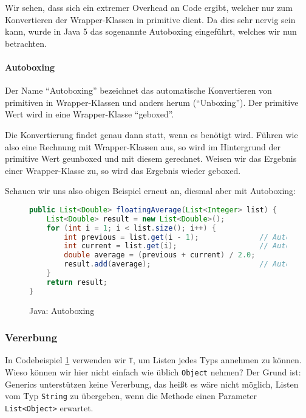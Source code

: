		Wir sehen, dass sich ein extremer Overhead an Code ergibt, welcher nur zum Konvertieren der Wrapper-Klassen in primitive dient. Da dies sehr nervig sein kann, wurde in Java 5 das sogenannte Autoboxing eingeführt, welches wir nun betrachten.
	
		\paragraph{Autoboxing}
			Der Name \enquote{Autoboxing} bezeichnet das automatische Konvertieren von primitiven in Wrapper-Klassen und anders herum (\enquote{Unboxing}). Der primitive Wert wird in eine Wrapper-Klasse \enquote{geboxed}.
			
			Die Konvertierung findet genau dann statt, wenn es benötigt wird. Führen wie also eine Rechnung mit Wrapper-Klassen aus, so wird im Hintergrund der primitive Wert geunboxed und mit diesem gerechnet. Weisen wir das Ergebnis einer Wrapper-Klasse zu, so wird das Ergebnis wieder geboxed.
			
			
			Schauen wir uns also obigen Beispiel erneut an, diesmal aber mit Autoboxing:
			\begin{figure}[H]
				\centering
				\begin{lstlisting}[language = Java, style = base]
public List<Double> floatingAverage(List<Integer> list) {
	List<Double> result = new List<Double>();
	for (int i = 1; i < list.size(); i++) {
		int previous = list.get(i - 1);              // Autounboxing
		int current = list.get(i);                   // Autounboxing
		double average = (previous + current) / 2.0;
		result.add(average);                         // Autoboxing
	}
	return result;
}
				\end{lstlisting}
				\caption{Java: Autoboxing}
				\label{fig:java_generics_motivation_gen}
			\end{figure}
	
	\subsubsection{Vererbung}
		In Codebeispiel \ref{fig:java_generics_motivation_gen} verwenden wir \texttt{T}, um Listen jedes Typs annehmen zu können. Wieso können wir hier nicht einfach wie üblich \texttt{Object} nehmen? Der Grund ist: Generics unterstützen keine Vererbung, das heißt es wäre nicht möglich, Listen vom Typ \texttt{String} zu übergeben, wenn die Methode einen Parameter \texttt{List<Object>} erwartet.
		
